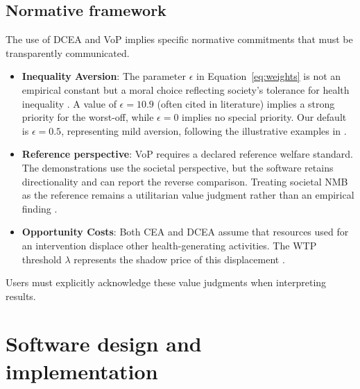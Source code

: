 \documentclass[article]{jss}
\begin{document}
\subsection{Normative framework}
The use of DCEA and VoP implies specific normative commitments that must be transparently communicated.
\begin{itemize}
    \item \textbf{Inequality Aversion}: The parameter $\epsilon$ in Equation~\ref{eq:weights} is not an empirical constant but a moral choice reflecting society's tolerance for health inequality \citep{atkinson1970}. A value of $\epsilon=10.9$ (often cited in literature) implies a strong priority for the worst-off, while $\epsilon=0$ implies no special priority. Our default is $\epsilon=0.5$, representing mild aversion, following the illustrative examples in \cite{cookson2017}.
    \item \textbf{Reference perspective}: VoP requires a declared reference welfare standard. The demonstrations use the societal perspective, but the software retains directionality and can report the reverse comparison. Treating societal NMB as the reference remains a utilitarian value judgment rather than an empirical finding \citep{brouwer2008}.
    \item \textbf{Opportunity Costs}: Both CEA and DCEA assume that resources used for an intervention displace other health-generating activities. The WTP threshold $\lambda$ represents the shadow price of this displacement \citep{claxton2010}.
\end{itemize}
Users must explicitly acknowledge these value judgments when interpreting results.

\section{Software design and implementation} \label{sec:arch}
\end{document}

